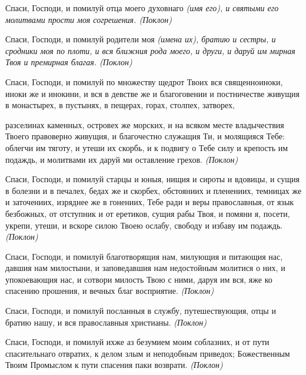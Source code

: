    Спаси, Господи, и помилуй отца моего духовнаго \itshape  (имя его)\normalfont{}, и святыми
его молитвами прости моя согрешения. \itshape  (Поклон)\normalfont{}



   Спаси, Господи, и помилуй родители моя \itshape  (имена их)\normalfont{}, братию и сестры, и
сродники моя по плоти, и вся ближния рода моего, и други, и даруй им
мирная Твоя и премирная благая. \itshape  (Поклон)\normalfont{}



   Спаси, Господи, и помилуй по множеству щедрот Твоих вся священноиноки,
иноки же и инокини, и вся в девстве же и благоговении и постничестве
живущия в монастырех, в пустынях, в пещерах, горах, столпех, затворех,

разселинах каменных, островех же морских, и на всяком месте владычествия
Твоего правоверно живущия, и благочестно служащия Ти, и молящияся
Тебе: облегчи им тяготу, и утеши их скорбь, и к подвигу о Тебе силу и
крепость им подаждь, и молитвами их даруй ми оставление грехов. \itshape 
(Поклон)\normalfont{}



   Спаси, Господи, и помилуй старцы и юныя, нищия и сироты и вдовицы,
и сущия в болезни и в печалех, бедах же и скорбех, обстояниих и
пленениих, темницах же и заточениих, изряднее же в гонениих, Тебе
ради и веры православныя, от язык безбожных, от отступник и от
еретиков, сущия рабы Твоя, и помяни я, посети, укрепи, утеши, и
вскоре силою Твоею ослабу, свободу и избаву им подаждь. \itshape  (Поклон)
\normalfont{}



   Спаси, Господи, и помилуй благотворящия нам, милующия и питающия
нас, давшия нам милостыни, и заповедавшия нам недостойным молитися о
них, и упокоевающия нас, и сотвори милость Твою с ними, даруя им вся,
яже ко спасению прошения, и вечных благ восприятие. \itshape  (Поклон)\normalfont{}



   Спаси, Господи, и помилуй посланныя в службу, путешествующия, отцы
и братию нашу, и вся православныя христианы. \itshape  (Поклон)\normalfont{}



   Спаси, Господи, и помилуй ихже аз безумием моим соблазних, и от
пути спасительнаго отвратих, к делом злым и неподобным приведох;
Божественным Твоим Промыслом к пути спасения паки возврати. \itshape  (Поклон)
\normalfont{}



